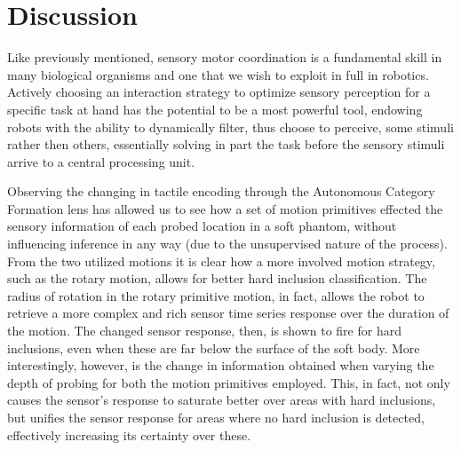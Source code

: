 \documentclass[]{interact}
\theoremstyle{plain}%
\theoremstyle{definition}
\theoremstyle{remark}
\begin{document}
 	  
\section{Discussion} 	\label{sec_discussion}
Like previously mentioned, sensory motor coordination is a fundamental skill in many biological organisms and one that we wish to exploit in full in robotics. Actively choosing an interaction strategy to optimize sensory perception for a specific task at hand has the potential to be a most powerful tool, endowing robots with the ability to dynamically filter, thus choose to perceive, some stimuli rather then others, essentially solving in part the task before the sensory stimuli arrive to a central processing unit. 

Observing the changing in tactile encoding through the Autonomous Category Formation lens has allowed us to see how a set of motion primitives effected the sensory information of each probed location in a soft phantom, without influencing inference in any way (due to the unsupervised nature of the process). From the two utilized motions it is clear how a more involved motion strategy, such as the rotary motion, allows for better hard inclusion classification. The radius of rotation in the rotary primitive motion, in fact, allows the robot to retrieve a more complex and rich sensor time series response over the duration of the motion. The changed sensor response, then, is shown to fire for hard inclusions, even when these are far below the surface of the soft body. More interestingly, however, is the change in information obtained when varying the depth of probing for both the motion primitives employed. This, in fact, not only causes the sensor's response to saturate better over areas with hard inclusions, but unifies the sensor response for areas where no hard inclusion is detected, effectively increasing its certainty over these. 
\end{document}
